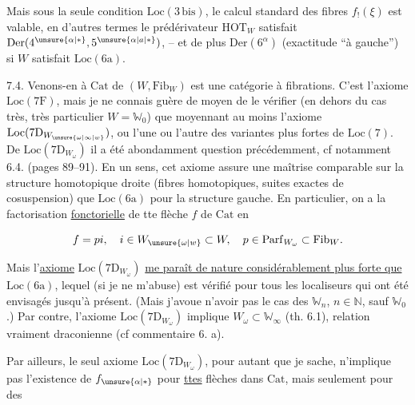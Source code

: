  Mais sous la seule condition $\mathrm{Loc}(3\,\mathrm{bis})$, le calcul standard des fibres  $f_!(\xi)$
est valable, en d'autres termes le prédérivateur $\mathrm{HOT}_W$ satisfait $\mathrm{Der}(4^{\unsure{\alpha|*}},5^{\unsure{\alpha|a|*}})$, -- et de plus $\mathrm{Der}(6^\alpha)$ (exactitude ``à gauche'') si $W$ satisfait $\mathrm{Loc}(6\mathrm{a})$.


7.4. Venons-en à   $\mathrm{Cat}$  de $(W,\mathrm{Fib}_W)$ est une catégorie à fibrations. C'est l'axiome \uline{$\mathrm{Loc}(7\mathrm{F})$}, mais je ne connais guère de moyen de le vérifier (en dehors du cas très, très particulier $W=\mathbb{W}_0$) que moyennant  au moins l'axiome \uline{$\mathrm{Loc}(7\mathrm{D}_{W_{\unsure{\omega|\infty|w}}})$}, ou l'une ou l'autre des variantes plus fortes de $\mathrm{Loc}(7)$. De $\mathrm{Loc}(7\mathrm{D}_{W_\omega})$ il a été abondamment question  précédemment, cf notamment 6.4. (pages 89--91). En un sens, cet axiome assure une maîtrise comparable sur la structure homotopique droite (fibres homotopiques, suites exactes de cosuspension) que $\mathrm{Loc}(6\mathrm{a})$ pour la
structure gauche. En particulier, on a la factorisation \uline{fonctorielle} de tte flèche $f$ de $\mathrm{Cat}$ en

\[
 f=pi,\quad i\in W_{\unsure{\omega|w}}\subset W,\quad p\in\mathrm{Parf}_{W_\omega}\subset\mathrm{Fib}_W.
\]

Mais l'\uline{axiome} $\mathrm{Loc}(7\mathrm{D}_{W_\omega})$ \uline{me paraît de nature considérablement plus forte que} $\mathrm{Loc}(6\mathrm{a})$, lequel (si je ne m'abuse) est vérifié pour tous les localiseurs qui ont été envisagés jusqu'à présent. (Mais j'avoue n'avoir pas  le cas des $\mathbb{W}_n$, $n\in\mathbb{N}$, sauf $\mathbb{W}_0$.) Par contre, l'axiome  $\mathrm{Loc}(7\mathrm{D}_{W_\omega})$ implique $W_\omega\subset\mathbb{W}_\infty$ (th. 6.1), relation vraiment draconienne (cf commentaire 6. a).

Par ailleurs, le seul axiome $\mathrm{Loc}(7\mathrm{D}_{W_\omega})$, pour autant que je sache, n'implique pas l'existence de $f_{\unsure{\alpha|*}}$ pour \uline{ttes} flèches dans $\mathrm{Cat}$, mais seulement pour des
